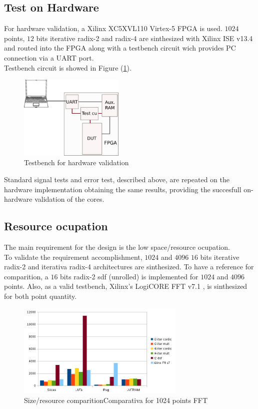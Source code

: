 \documentclass[conference]{IEEEtran}
\begin{document}
\subsection{Test on Hardware}

For hardware validation, a Xilinx XC5XVL110 Virtex-5 FPGA is used. $1024$ points, $12$ bits iterative radix-2 and radix-4 are 
sinthesized with Xilinx ISE v13.4 and routed into the FPGA along with a testbench circuit wich provides PC connection via a UART port.\\
Testbench circuit is showed in Figure (\ref{fig:hw_tb}).\\

\begin{figure}[htb!]
        \centering
        \includegraphics[width=5cm]{./figures/hw_tb.png}
        \caption{Testbench for hardware validation}
        \label{fig:hw_tb}
\end{figure}

Standard signal tests and error test, described above, are repeated on the hardware implementation obtaining the same results, 
providing the succesfull on-hardware validation of the cores.

\subsection{Resource ocupation}

The main requirement for the design is the low space/resource ocupation.\\
To validate the requirement accomplishment, $1024$ and $4096$ $16$ bits iterative radix-2 and iterativa radix-4 architectures are 
sinthesized. To have a reference for comparition, a $16$ bits radix-2 sdf (unrolled) is implemented for $1024$ and $4096$ points.
Also, as a valid testbench, Xilinx's LogiCORE FFT v7.1 \cite{fftXilinx}, is sinthesized for both point quantity.\\

\begin{figure}[htb!]
        \centering
        \includegraphics[width=8cm]{./figures/sizecomp1024.png}
        \caption{Size/resource comparitionComparativa for 1024 points FFT}
        \label{fig:sizecomp1024}
\end{figure}
\end{document}
